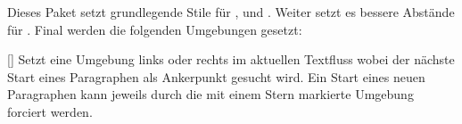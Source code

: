 Dieses Paket setzt grundlegende Stile für ,  und .  Weiter setzt es bessere Abstände für . Final werden die folgenden Umgebungen gesetzt:

%
%
%

[\cmdlist{}\cmdlist\secline{}\cmdlist{}]
Setzt eine Umgebung links oder rechts im aktuellen Textfluss wobei der nächste Start eines Paragraphen als Ankerpunkt gesucht wird. Ein Start eines neuen Paragraphen kann jeweils durch die mit einem Stern markierte Umgebung forciert werden.
